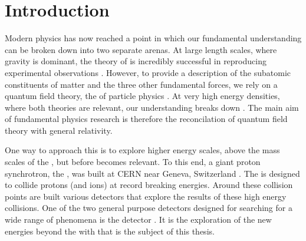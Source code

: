 \chapter{Introduction}
\label{chap:introduction}





Modern physics has now reached a point in which our fundamental
understanding can be broken down into two separate arenas. At large
length scales, where gravity is dominant, the theory of \GR
\cite{1914ZMP63215E} is incredibly successful in reproducing
experimental observations \cite{Will:2014kxa}.  However, to provide a
description of the subatomic constituents of matter and the three
other fundamental forces, we rely on a quantum field theory, the \SM
of particle physics
\cite{Salam:1964ry,Glashow:1961tr,PhysRevLett.19.1264}. At very high
energy densities, where both theories are relevant, our understanding
breaks down \cite{Weinberg:1980gg}. The main aim of fundamental
physics research is therefore the reconcilation of quantum field
theory with general relativity. 

One way to approach this is to explore higher energy scales, above the
mass scales of the \SM, but before \GR becomes relevant. To this end, a
giant proton synchrotron, the \LHC, was built at CERN near Geneva,
Switzerland \cite{Evans:2008zzb}. The \LHC is designed to collide
protons (and ions) at record breaking energies. Around these collision
points are built various detectors that explore the results of these
high energy collisions. One of the two general purpose detectors
designed for searching for a wide range of phenomena is the \CMS
detector \cite{Chatrchyan:2008aa}. It is the exploration of the new
energies beyond the \SM with \CMS that is the subject of this thesis.

